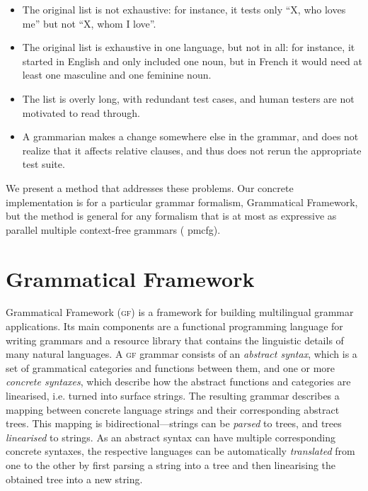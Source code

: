 \documentclass[11pt]{article}
\def\gf{\textsc{gf}}
\begin{document}

\begin{itemize}
\item The original list is not exhaustive: for instance, it tests only
``X, who loves me'' but not ``X, whom I love''. 
\item The original list is exhaustive in one language, but not in all:
for instance, it started in English and only included one noun, but in
French it would need at least one masculine and one feminine noun. 
\item The list is overly long, with redundant test cases, and human
testers are not motivated to read through. 
\item A grammarian makes a change somewhere else in the grammar, and
does not realize that it affects relative clauses, and thus does not
rerun the appropriate test suite. 
\end{itemize}

We present a method that addresses these problems. Our concrete
implementation is for a particular grammar formalism, Grammatical
Framework, but the method is general for any formalism that is at most
as expressive as parallel multiple context-free grammars ({\sc
  pmcfg}). %

\section{Grammatical Framework}
Grammatical Framework (\gf) \cite{ranta2004gf} 
is a framework for building multilingual grammar applications. Its main
components are a functional programming language for writing grammars
and a resource library \cite{ranta2009rgl} that contains the
linguistic details of many natural languages. A \gf{} grammar consists
of an \emph{abstract syntax}, which is a set of grammatical categories and
functions between them, and one or more \emph{concrete
  syntaxes}, which describe how the abstract functions and categories
are linearised, i.e. turned into surface strings. The resulting
grammar describes a mapping between concrete language strings and
their corresponding abstract trees. This mapping is
bidirectional---strings can be \emph{parsed} to trees, and trees
\emph{linearised} to strings. As an abstract syntax can have multiple
corresponding concrete syntaxes, the respective languages can be
automatically \emph{translated} from one to the other by first parsing
a string into a tree and then linearising the obtained tree into a new
string. 
\end{document}
